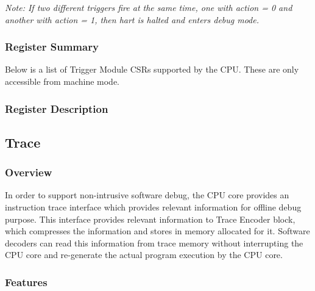 \documentclass[main\_\_EN.tex]{subfiles}
\begin{document}
\textit{Note: If two different triggers fire at the same time, one with action = 0 and another with action = 1, then hart is halted and enters debug mode.}


\hypertarget{riscvcpu-hwt-reg-summ}{}
\subsubsection{Register Summary}
\label{sec:riscvcpu-hwt-reg-summ}


Below is a list of Trigger Module CSRs supported by the CPU. These are only accessible from machine mode.




\subsubsection{Register Description}




\newpage
\subsection{Trace}
\label{sec:riscvcpu-trace}

\subsubsection{Overview}
\label{sec:riscvcpu-trace-overview}
In order to support non-intrusive software debug, the CPU core provides an instruction trace interface which provides relevant information for offline debug purpose. This interface provides relevant information to Trace Encoder block, which compresses the information and stores in memory allocated for it. Software decoders can read this information from trace memory without interrupting the CPU core and re-generate the actual program execution by the CPU core.


\subsubsection{Features}
\label{sec:riscvcpu-trace-features}
\end{document}
